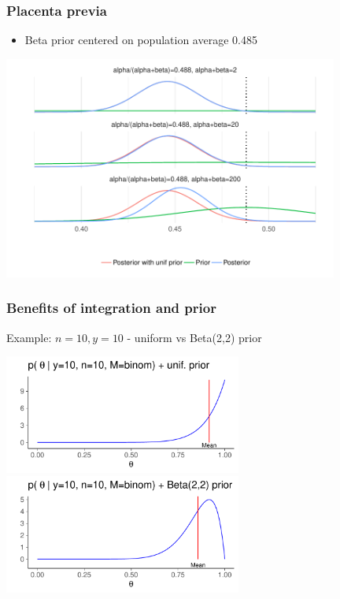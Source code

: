 \documentclass[10pt,handout]{beamer}
\begin{document}
\begin{frame}
  \frametitle{Placenta previa}

  \begin{itemize}
  \item Beta prior centered on population average 0.485
  \end{itemize}
  \includegraphics[width=11cm]{figs/demo2_2.pdf}
\end{frame}

\begin{frame}
  \frametitle{Benefits of integration and prior}

  \vspace{-0.5\baselineskip}
  Example: $n=10, y=10$ - uniform vs Beta(2,2) prior
  \begin{center}
  \includegraphics[width=7.8cm]{figs/dbbeta10a.pdf}\\
  \includegraphics[width=7.8cm]{figs/dbbeta10b.pdf}
  \end{center}

\end{frame}
\end{document}
